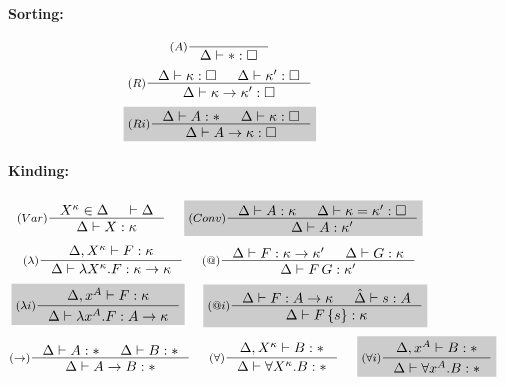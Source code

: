 \begin{figure}
\begin{minipage}{.2\textwidth}
\paragraph{Sorting:}
\[ \inference[($A$)]{}{\Delta |- *:\square} \]
\[ \inference[($R$)]{\Delta |- \kappa:\square & \Delta |- \kappa':\square}
                    {\Delta |- \kappa -> \kappa' : \square}
\]\vspace*{.2em}
\[ \newFi{
   \inference[($Ri$)]{\Delta |- A:* & \Delta |- \kappa:\square}
                     {\Delta |- A -> \kappa : \square} }
\]
\end{minipage}

\paragraph{Kinding:}
\[ \inference[($Var$)]{X^\kappa\in\Delta & |- \Delta}
                       {\Delta |- X : \kappa}
 ~~~~ \newFi{
   \inference[($Conv$)]{ \Delta |- A : \kappa
                       & \Delta |- \kappa = \kappa' : \square }
                       {\Delta |- A : \kappa'} }
\]
\[
   \inference[($\lambda$)]{\Delta,X^\kappa |- F : \kappa}
                          {\Delta |- \lambda X^\kappa.F : \kappa->\kappa}
 ~~~~
 \inference[($@$)]{ \Delta |- F : \kappa -> \kappa'
                      & \Delta |- G : \kappa }
                      {\Delta |- F\,G : \kappa'}
\]
\[ \newFi{
   \inference[($\lambda i$)]{\Delta,x^A |- F : \kappa}
                            {\Delta |- \lambda x^A.F : A->\kappa} }
 ~~~~ \newFi{
   \inference[($@i$)]{ \Delta |- F : A -> \kappa
                     & \hat\Delta |- s : A }
                     {\Delta |- F\,\{s\} : \kappa} }
\]
\[ \inference[($->$)]{\Delta |- A : * & \Delta |- B : *}
                     {\Delta |- A -> B : * }
 ~~~~
   \inference[($\forall$)]{\Delta, X^\kappa |- B : *}
                            {\Delta |- \forall X^\kappa . B : *}
 ~~~~ \newFi{
   \inference[($\forall i$)]{\Delta, x^A |- B : *}
                              {\Delta |- \forall x^A . B : *} }
\]


\end{figure}
